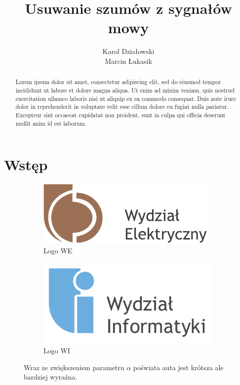 \documentclass[wi]{zut}
\author{Karol Działowski \\ Marcin Łukasik}
\title{Usuwanie szumów z sygnałów mowy}
\begin{document}
\maketitle

\begin{abstract}
    Lorem ipsum dolor sit amet, consectetur adipiscing elit, sed do eiusmod tempor incididunt ut labore et dolore magna aliqua. Ut enim ad minim veniam, quis nostrud exercitation ullamco laboris nisi ut aliquip ex ea commodo consequat. Duis aute irure dolor in reprehenderit in voluptate velit esse cillum dolore eu fugiat nulla pariatur. Excepteur sint occaecat cupidatat non proident, sunt in culpa qui officia deserunt mollit anim id est laborum.
\end{abstract}
\tableofcontents

\section{Wstęp}



\begin{figure}[H]
    \centering
    \begin{subfigure}{0.49\textwidth}
    \includegraphics[width=1\linewidth]{graphic/logo_WE.pdf}
    \caption{Logo WE}
    \end{subfigure}
    \begin{subfigure}{0.49\textwidth}
    \includegraphics[width=1\linewidth]{graphic/logo_WI.pdf}
    \caption{Logo WI}
    \end{subfigure}
    \caption{Wraz ze zwiększeniem parametru $\alpha$ poświata auta jest krótsza ale bardziej wyraźna.}
    \label{fig:spectograms}
\end{figure}
\end{document}
